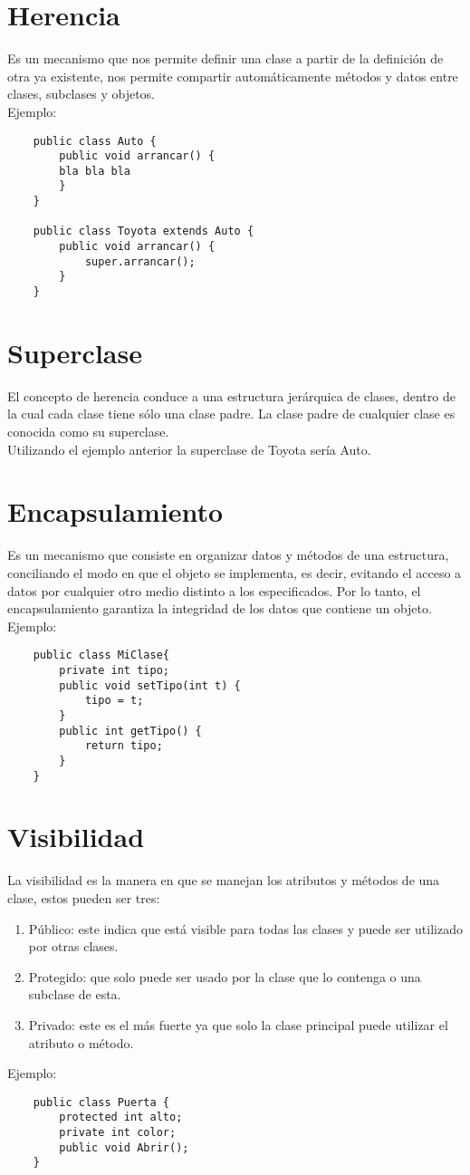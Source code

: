 \documentclass{book} %
\begin{document}
\section{Herencia}
Es un mecanismo que nos permite definir una clase a partir de la definición de otra ya existente, nos permite compartir automáticamente métodos y datos entre clases, subclases y objetos. \\ Ejemplo:
\begin{verbatim}
	public class Auto {
		public void arrancar() {
		bla bla bla 
		}
	}
	
	public class Toyota extends Auto {
		public void arrancar() {
			super.arrancar();
		}
	}
\end{verbatim}
\section{Superclase}
El concepto de herencia conduce a una estructura jerárquica de clases, dentro de la cual cada clase tiene sólo una clase padre. La clase padre de cualquier clase es conocida como su superclase.\\
Utilizando el ejemplo anterior la superclase de Toyota sería Auto.
\section{Encapsulamiento}
Es un mecanismo que consiste en organizar datos y métodos de una estructura, conciliando el modo en que el objeto se implementa, es decir, evitando el acceso a datos por cualquier otro medio distinto a los especificados. Por lo tanto, el encapsulamiento garantiza la integridad de los datos que contiene un objeto. \\Ejemplo:
\begin{verbatim}
	public class MiClase{
		private int tipo;
		public void setTipo(int t) {
			tipo = t;
		}
		public int getTipo() {
			return tipo;
		}
	}
\end{verbatim}
\section{Visibilidad}
La visibilidad es la manera en que se manejan los atributos y métodos de una clase, estos pueden ser tres:
\begin{enumerate}
	\item Público: este indica que está visible para todas las clases y puede ser utilizado por otras clases. 
	\item Protegido: que solo puede ser usado por la clase que lo contenga o una subclase de esta. 
	\item Privado: este es el más fuerte ya que solo la clase principal puede utilizar el atributo o método.
\end{enumerate}
Ejemplo:
\begin{verbatim}
	public class Puerta {
		protected int alto; 
		private int color;
		public void Abrir();
	}
\end{verbatim}
\end{document}
